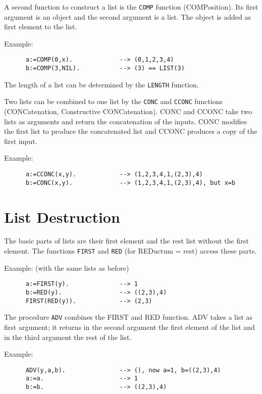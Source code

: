 A second function to construct a list is the 
\verb/COMP/ function (COMPosition).
Its first argument is an object and the second
argument is a list. The object is added as first element 
to the list.

Example: 
\begin{verbatim}
      a:=COMP(0,x).             --> (0,1,2,3,4)
      b:=COMP(3,NIL).           --> (3) == LIST(3)
\end{verbatim}

The length of a list can be determined by the
\verb/LENGTH/ function. 

Two lists can be combined to one list by the
\verb/CONC/ and \verb/CCONC/ functions 
(CONCatenation, Constructive CONCatenation).
CONC and CCONC take two lists as arguments and
return the concatenation of the inputs.
CONC modifies the first list to produce the 
concatenated list and CCONC produces a copy of the
first input. 

Example: 
\begin{verbatim}
      a:=CCONC(x,y).            --> (1,2,3,4,1,(2,3),4)
      b:=CONC(x,y).             --> (1,2,3,4,1,(2,3),4), but x=b 
\end{verbatim}


\section{List Destruction}

The basic parts of lists are their first element and
the rest list without the first element.
The functions \verb/FIRST/ and \verb/RED/ (for REDuctum = rest)
access these parts.

Example: (with the same lists as before) 
\begin{verbatim}
      a:=FIRST(y).              --> 1
      b:=RED(y).                --> ((2,3),4) 
      FIRST(RED(y)).            --> (2,3)
\end{verbatim}

The procedure \verb/ADV/ combines the 
FIRST and RED function. ADV takes a list as first argument;
it returns in the second argument the first element of the list 
and in the third argument the rest of the list.

Example: 
\begin{verbatim}
      ADV(y,a,b).               --> (), now a=1, b=((2,3),4)
      a:=a.                     --> 1
      b:=b.                     --> ((2,3),4)
\end{verbatim}

